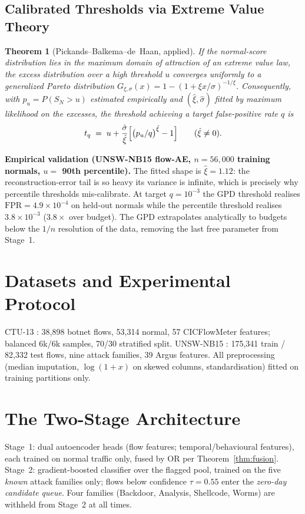 \documentclass[journal]{IEEEtran}
\newtheorem{theorem}{Theorem}
\newcommand{\FPR}{\mathrm{FPR}}
\begin{document}
\subsection{Calibrated Thresholds via Extreme Value Theory}

\begin{theorem}[Pickands--Balkema--de~Haan, applied]\label{thm:evt}
If the normal-score distribution lies in the maximum domain of attraction of
an extreme value law, the excess distribution over a high threshold $u$
converges uniformly to a generalized Pareto distribution
$G_{\xi,\sigma}(x) = 1-(1+\xi x/\sigma)^{-1/\xi}$. Consequently, with
$p_u = P(S_N > u)$ estimated empirically and $(\hat\xi,\hat\sigma)$ fitted by
maximum likelihood on the excesses, the threshold achieving a target
false-positive rate $q$ is
\[
t_q \;=\; u + \frac{\hat\sigma}{\hat\xi}
\Bigl[\bigl(p_u/q\bigr)^{\hat\xi} - 1\Bigr]
\qquad (\hat\xi\neq 0).
\]
\end{theorem}

\textbf{Empirical validation (UNSW-NB15 flow-AE, $n=56{,}000$ training
normals, $u=$ 90th percentile).} The fitted shape is $\hat\xi = 1.12$: the
reconstruction-error tail is so heavy its variance is infinite, which is
precisely why percentile thresholds mis-calibrate. At target $q=10^{-3}$ the
GPD threshold realises $\FPR=4.9\times10^{-4}$ on held-out normals while the
percentile threshold realises $3.8\times10^{-3}$ ($3.8\times$ over budget).
The GPD extrapolates analytically to budgets below the $1/n$ resolution of the
data, removing the last free parameter from Stage~1.

\section{Datasets and Experimental Protocol}\label{sec:data}
CTU-13 \cite{garcia2014}: 38{,}898 botnet flows, 53{,}314 normal, 57
CICFlowMeter features; balanced 6k/6k samples, 70/30 stratified split.
UNSW-NB15 \cite{moustafa2015}: 175{,}341 train / 82{,}332 test flows, nine
attack families, 39 Argus features. All preprocessing (median imputation,
$\log(1{+}x)$ on skewed columns, standardisation) fitted on training partitions
only.

\section{The Two-Stage Architecture}\label{sec:system}
Stage~1: dual autoencoder heads (flow features; temporal/behavioural features),
each trained on normal traffic only, fused by OR per
Theorem~\ref{thm:fusion}. Stage~2: gradient-boosted classifier over the
flagged pool, trained on the five \emph{known} attack families only; flows
below confidence $\tau=0.55$ enter the \emph{zero-day candidate queue}.
Four families (Backdoor, Analysis, Shellcode, Worms) are withheld from
Stage~2 at all times.
\end{document}

